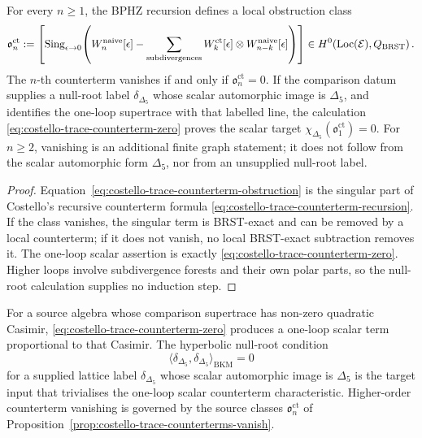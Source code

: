 \begin{proposition}
\label{prop:costello-trace-counterterms-vanish}
For every $n\geq 1$, the BPHZ recursion defines a local obstruction
class
\begin{equation}\label{eq:costello-trace-counterterm-obstruction}
 \mathfrak{o}^{\mathrm{ct}}_n
 :=
 \left[
 \mathrm{Sing}_{\epsilon\to 0}\!\left(
 W_n^{\mathrm{naive}}[\epsilon]
 - \sum_{\textup{subdivergences}}
 W_k^{\mathrm{ct}}[\epsilon]\otimes W_{n-k}^{\mathrm{naive}}[\epsilon]
 \right)\right]
 \in
 H^0\!\left(\mathrm{Loc}(\mathcal E),Q_{\mathrm{BRST}}\right).
\end{equation}
The $n$-th counterterm vanishes if and only if
\(\mathfrak{o}^{\mathrm{ct}}_n=0\). If the comparison datum supplies a
null-root label \(\delta_{\Delta_5}\) whose scalar automorphic image is
\(\Delta_5\), and identifies the one-loop supertrace with that labelled
line, the calculation \eqref{eq:costello-trace-counterterm-zero} proves the
scalar target \(\chi_{\Delta_5}(\mathfrak{o}^{\mathrm{ct}}_1)=0\).
For \(n\geq2\), vanishing is an additional finite graph statement; it
does not follow from the scalar automorphic form \(\Delta_5\), nor from
an unsupplied null-root label.
\end{proposition}

\begin{proof}
Equation~\eqref{eq:costello-trace-counterterm-obstruction} is the
singular part of Costello's recursive counterterm formula
\eqref{eq:costello-trace-counterterm-recursion}. If the class vanishes,
the singular term is BRST-exact and can be removed by a local
counterterm; if it does not vanish, no local BRST-exact subtraction
removes it. The one-loop scalar assertion is exactly
\eqref{eq:costello-trace-counterterm-zero}. Higher loops involve
subdivergence forests and their own polar parts, so the null-root
calculation supplies no induction step.
\end{proof}

\begin{remark}
\label{rem:costello-trace-delta5-specific}
For a source algebra whose comparison supertrace has non-zero quadratic
Casimir, \eqref{eq:costello-trace-counterterm-zero} produces a one-loop
scalar term proportional to that Casimir. The hyperbolic null-root
condition
\[
\langle\delta_{\Delta_5},\delta_{\Delta_5}\rangle_{\mathrm{BKM}}=0
\]
for a supplied lattice label \(\delta_{\Delta_5}\) whose scalar
automorphic image is \(\Delta_5\)
\cite[\S 2]{GritsenkoNikulin1998}
is the target input that trivialises the one-loop scalar counterterm
characteristic. Higher-order counterterm vanishing is
governed by the source classes
\(\mathfrak{o}^{\mathrm{ct}}_n\) of
Proposition~\ref{prop:costello-trace-counterterms-vanish}.
\end{remark}

